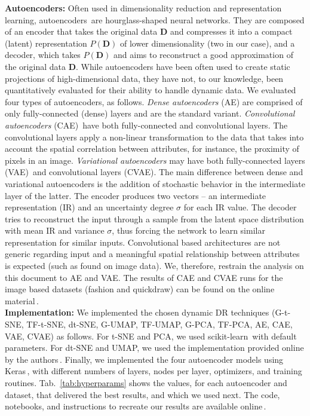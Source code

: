 \noindent\textbf{Autoencoders:} Often used in dimensionality reduction and representation learning, autoencoders\,\citep{aes,Ballard1987} are hourglass-shaped neural networks. They are composed of an encoder that takes the original data $\mathbf{D}$ and compresses it into a compact (latent) representation $P(\mathbf{D})$ of lower dimensionality (two in our case), and a decoder, which takes $P(\mathbf{D})$ and aims to reconstruct a good approximation of the original data $\mathbf{D}$. While autoencoders have been often used to create static projections of high-dimensional data, they have not, to our knowledge, been quantitatively evaluated for their ability to handle dynamic data. We evaluated four types of autoencoders, as follows. \emph{Dense autoencoders} (AE) are comprised of only fully-connected (dense) layers and are the standard variant. \emph{Convolutional autoencoders} (CAE)\,\citep{Masci2011} have both fully-connected and convolutional layers. The convolutional layers apply a non-linear transformation to the data that takes into account the spatial correlation between attributes, for instance, the proximity of pixels in an image. \emph{Variational autoencoders} may have both fully-connected layers (VAE)\,\citep{Kingma2013} and convolutional layers (CVAE). The main difference between dense and variational autoencoders is the addition of stochastic behavior in the intermediate layer of the latter. The encoder produces two vectors -- an intermediate representation (IR) and an uncertainty degree $\sigma$ for each IR value. The decoder tries to reconstruct the input through a sample from the latent space distribution with mean IR and variance $\sigma$, thus forcing the network to learn similar representation for similar inputs.
Convolutional based architectures are not generic regarding input and a meaningful spatial relationship between attributes is expected (such as found on image data). We, therefore, restrain the analysis on this document to AE and VAE. The results of CAE and CVAE runs for the image based datasets (fashion and quickdraw) can be found on the online material\,\citep{repo}.\\


\noindent\textbf{Implementation:} We implemented the chosen dynamic DR techniques (G-t-SNE, TF-t-SNE, dt-SNE, G-UMAP, TF-UMAP, G-PCA, TF-PCA, AE, CAE, VAE, CVAE) as follows. For t-SNE and PCA, we used scikit-learn\,\citep{scikit-learn} with default parameters. For dt-SNE and UMAP, we used the implementation provided online by the authors\,\citep{Rauber2016,umap}. Finally, we implemented the four autoencoder models using Keras\,\citep{chollet2015keras}, with different numbers of layers, nodes per layer, optimizers, and training routines. Tab.~\ref{tab:hyperparams} shows the values, for each autoencoder and dataset, that delivered the best results, and which we used next. The code, notebooks, and instructions to recreate our results are available online\,\citep{repo}.

